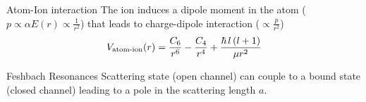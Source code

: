 \begin{frame}[t]{Atom-Ion interaction}
    The ion induces a dipole moment in the atom ($p \propto \alpha E(r) \propto \frac{1}{r^2}$) that leads to
    charge-dipole interaction ($\propto\frac{p}{r^2}$)
   \[
        \setlength{\abovedisplayskip}{2pt}
        \setlength{\belowdisplayskip}{2pt}
       V_\text{atom-ion}(r) = \frac{C_6}{r^6} - \frac{C_4}{r^4} + \frac{\hbar \,l\,(l+1)}{\mu r^2}
       \]
\end{frame}

\begin{frame}[t]{Feshbach Resonances}
    Scattering state (open channel) can couple to a bound state (closed channel) leading to a pole in the
    scattering length $a$.
\end{frame}
